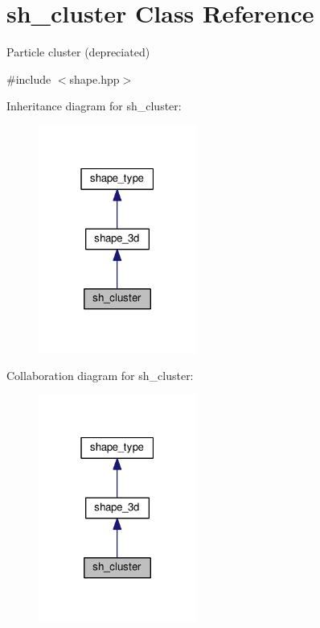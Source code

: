 \hypertarget{classsh__cluster}{}\section{sh\+\_\+cluster Class Reference}
\label{classsh__cluster}


Particle cluster (depreciated)  




{\ttfamily \#include $<$shape.\+hpp$>$}



Inheritance diagram for sh\+\_\+cluster\+:
\nopagebreak
\begin{figure}[H]
\begin{center}
\leavevmode
\includegraphics[width=147pt]{db/dad/classsh__cluster__inherit__graph}
\end{center}
\end{figure}


Collaboration diagram for sh\+\_\+cluster\+:
\nopagebreak
\begin{figure}[H]
\begin{center}
\leavevmode
\includegraphics[width=147pt]{d8/d09/classsh__cluster__coll__graph}
\end{center}
\end{figure}
